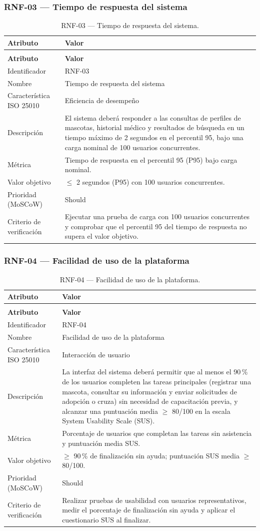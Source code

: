\documentclass[journal,onecolumn]{IEEEtran}
\makeatletter
\newenvironment{atributos}[2]{%
	\small
	\begin{longtable}{@{}>{\raggedright\arraybackslash}p{4.2cm} >{\raggedright\arraybackslash}p{11.2cm}@{}}
		\caption{#2}\label{tab:#1}\\
		\toprule
		\textbf{Atributo} & \textbf{Valor} \\
		\midrule
		\endfirsthead
		\multicolumn{2}{@{}l}{\small\itshape (continuación)}\\
		\toprule
		\textbf{Atributo} & \textbf{Valor} \\
		\midrule
		\endhead
		\bottomrule
		\endlastfoot
	}{%
	\end{longtable}
	\normalsize
}
\makeatother
\begin{document}
	\subsubsection{RNF-03 --- Tiempo de respuesta del sistema}
	
	\begin{atributos}{RNF-03}{RNF-03 --- Tiempo de respuesta del sistema.}
		Identificador & RNF-03 \\
		Nombre & Tiempo de respuesta del sistema \\
		Característica ISO 25010 & Eficiencia de desempeño \\
		Descripción & El sistema deberá responder a las consultas de perfiles de mascotas, historial médico y resultados de búsqueda en un tiempo máximo de 2 segundos en el percentil 95, bajo una carga nominal de 100 usuarios concurrentes. \\
		Métrica & Tiempo de respuesta en el percentil 95 (P95) bajo carga nominal. \\
		Valor objetivo & $\leq$ 2 segundos (P95) con 100 usuarios concurrentes. \\
		Prioridad (MoSCoW) & Should \\
		Criterio de verificación & Ejecutar una prueba de carga con 100 usuarios concurrentes y comprobar que el percentil 95 del tiempo de respuesta no supera el valor objetivo. \\
	\end{atributos}
	
	\subsubsection{RNF-04 --- Facilidad de uso de la plataforma}
	
	\begin{atributos}{RNF-04}{RNF-04 --- Facilidad de uso de la plataforma.}
		Identificador & RNF-04 \\
		Nombre & Facilidad de uso de la plataforma \\
		Característica ISO 25010 & Interacción de usuario \\
		Descripción & La interfaz del sistema deberá permitir que al menos el 90\,\% de los usuarios completen las tareas principales (registrar una mascota, consultar su información y enviar solicitudes de adopción o cruza) sin necesidad de capacitación previa, y alcanzar una puntuación media $\geq$ 80/100 en la escala System Usability Scale (SUS). \\
		Métrica & Porcentaje de usuarios que completan las tareas sin asistencia y puntuación media SUS. \\
		Valor objetivo & $\geq$ 90\,\% de finalización sin ayuda; puntuación SUS media $\geq$ 80/100. \\
		Prioridad (MoSCoW) & Should \\
		Criterio de verificación & Realizar pruebas de usabilidad con usuarios representativos, medir el porcentaje de finalización sin ayuda y aplicar el cuestionario SUS al finalizar. \\
	\end{atributos}
	
\end{document}
